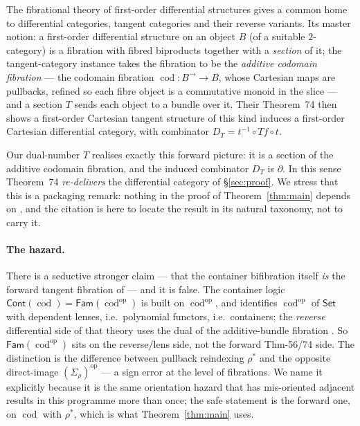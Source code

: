 \documentclass[11pt]{article}
\theoremstyle{definition}
\newcommand{\Cont}{\mathsf{Cont}}
\newcommand{\Set}{\mathsf{Set}}
\newcommand{\Fam}{\mathsf{Fam}}
\newcommand{\cod}{\operatorname{cod}}
\begin{document}
The fibrational theory of first-order differential structures \cite{CCGZ2024} gives a common home to
differential categories, tangent categories and their reverse variants. Its master notion: a
first-order differential structure on an object $B$ (of a suitable $2$-category) is a fibration with
fibred biproducts together with a \emph{section} of it; the tangent-category instance
\cite[Thm.~56]{CCGZ2024} takes the fibration to be the \emph{additive codomain fibration} --- the
codomain fibration $\cod\colon B^\to\to B$, whose Cartesian maps are pullbacks, refined so each fibre
object is a commutative monoid in the slice --- and a section $T$ sends each object to a bundle over
it. Their Theorem~74 then shows a first-order Cartesian tangent structure of this kind induces a
first-order Cartesian differential category, with combinator $D_T=t^{-1}\circ Tf\circ t$.

Our dual-number $T$ realises exactly this forward picture: it is a section of the additive codomain
fibration, and the induced combinator $D_T$ is $\partial$. In this sense Theorem~74 \emph{re-delivers}
the differential category of \S\ref{sec:proof}. We stress that this is a packaging remark: nothing in
the proof of Theorem~\ref{thm:main} depends on \cite{CCGZ2024}, and the citation is here to locate the
result in its natural taxonomy, not to carry it.

\paragraph{The hazard.}
There is a seductive stronger claim --- that the container bifibration itself \emph{is} the forward
tangent fibration of \cite{CCGZ2024} --- and it is false. The container logic
$\Cont(\cod)=\Fam(\cod^{\mathrm{op}})$ is built on $\cod^{\mathrm{op}}$, and
\cite[Ex.~32]{CCGZ2024} identifies $\cod^{\mathrm{op}}$ of $\Set$ with dependent lenses, i.e.\
polynomial functors, i.e.\ containers; the \emph{reverse} differential side of that theory uses the
dual of the additive-bundle fibration \cite[Def.~57]{CCGZ2024}. So $\Fam(\cod^{\mathrm{op}})$ sits on
the reverse/lens side, not the forward Thm-56/74 side. The distinction is the difference between
pullback reindexing $\rho^*$ and the opposite direct-image $(\Sigma_\rho)^{\mathrm{op}}$ --- a sign
error at the level of fibrations. We name it explicitly because it is the same orientation hazard that
has mis-oriented adjacent results in this programme more than once; the safe statement is the forward
one, on $\cod$ with $\rho^*$, which is what Theorem~\ref{thm:main} uses.
\end{document}
